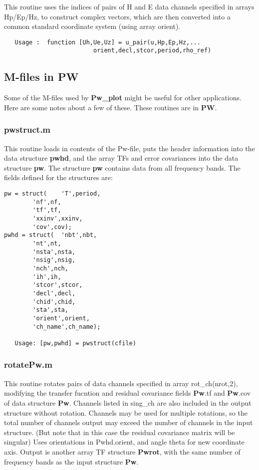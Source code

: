 This routine uses the indices of pairs of H and E data channels specified
in arrays Hp/Ep/Hz, to construct complex vectors, which are then converted
into a common standard coordinate system (using array orient).

\small
\begin{verbatim}
   Usage :  function [Uh,Ue,Uz] = u_pair(u,Hp,Ep,Hz,...
                         orient,decl,stcor,period,rho_ref)
\end{verbatim}
\normalsize

\subsection{M-files in PW}

Some of the M-files used by {\bf Pw\_plot} might be useful
for other applications.  Here are some notes about a few of these.
These routines are in {\bf PW}.

\subsubsection{pwstruct.m}

This routine loads in contents of the Pw-file,
puts the header information into the data structure {\bf pwhd},
and the array TFs and error covariances into the data structure {\bf pw}.
The structure {\bf pw} contains data from all frequency bands.
The fields defined for the structures are:
\small
\begin{verbatim}
pw = struct(	'T',period,
		'nf',nf,
		'tf',tf,
		'xxinv',xxinv,
		'cov',cov);
pwhd = struct(	'nbt',nbt,
		'nt',nt,
		'nsta',nsta,
		'nsig',nsig,
		'nch',nch,
		'ih',ih,
		'stcor',stcor,
		'decl',decl,
		'chid',chid,
		'sta',sta,
		'orient',orient,
		'ch_name',ch_name);

   Usage: [pw,pwhd] = pwstruct(cfile)

\end{verbatim}
\normalsize

\subsubsection{rotatePw.m} 
 
This routine rotates pairs of data channels specified in array rot\_ch(nrot,2),
modifying the transfer fucntion and residual covariance
fields {\bf Pw}.tf and {\bf Pw}.cov of data structure {\bf Pw}.
Channels listed in sing\_ch are also included in the output structure
without rotation.  Channels may be used for multiple rotations, 
so the total number of channels output may exceed the number of channels
in the input structure.
(But note that in this case the residual covariance matrix will
be singular)
Uses orientations in Pwhd.orient, and angle theta for new coordinate
axis.
Output is another array TF structure {\bf Pwrot}, with the same number of
frequency bands as the input structure {\bf Pw}.

